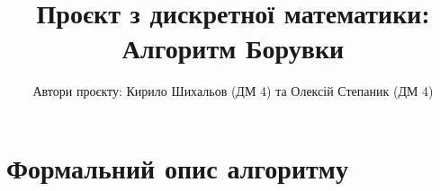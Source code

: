 \documentclass[]{article}
\title{Проєкт з дискретної математики: 
	Алгоритм Борувки}
\author{Автори проєкту: Кирило Шихальов (ДМ 4) та Олексій Степаник (ДМ 4)}
\date{}
\begin{document}
\maketitle
\section*{Формальний опис алгоритму}
\end{document}
